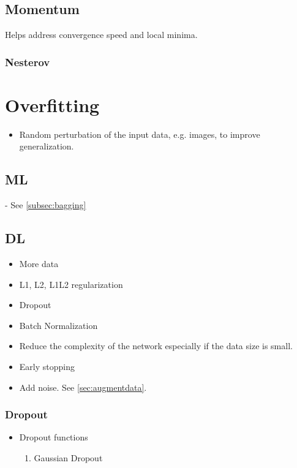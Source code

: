 \documentclass[a4paper, 12pt]{report}
\begin{document}
\section{Momentum}
Helps address convergence speed and local minima.

\subsection{Nesterov}

\chapter{Overfitting}
\begin{itemize}
\item Random perturbation of the input data, e.g. images, to improve generalization.
\end{itemize}
\section{ML}
- See  \autoref{subsec:bagging}

\section{DL}
\begin{itemize}
\item More data
\item L1, L2, L1L2 regularization
\item Dropout
\item Batch Normalization
\item Reduce the complexity of the network especially if the data size is small.
\item Early stopping
\item Add noise. See  \autoref{sec:augmentdata}.
\end{itemize}

\subsection{Dropout}
\begin{itemize}
\item Dropout functions
\begin{enumerate}
\item Gaussian Dropout
\end{enumerate}
\end{itemize}
\end{document}
